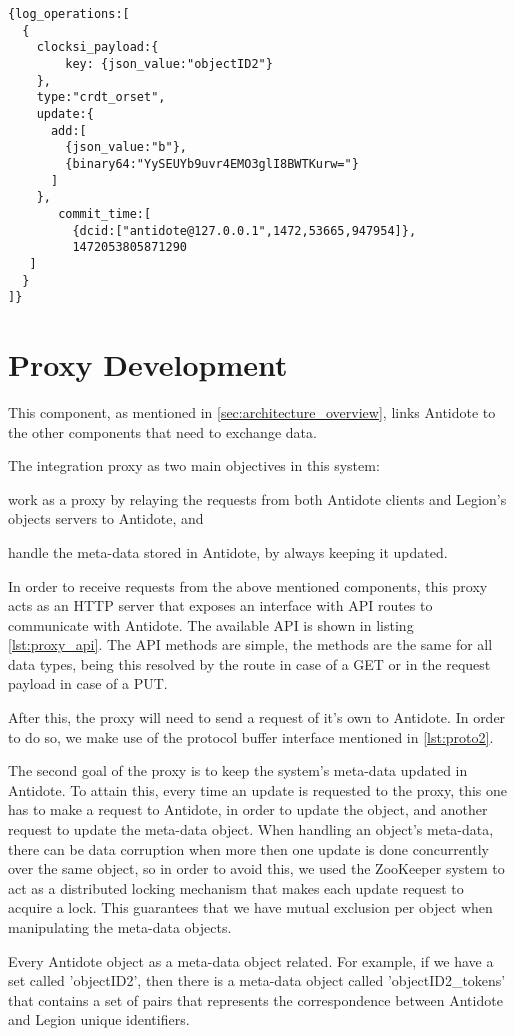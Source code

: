\begin{lstlisting}[caption={Antidote log response example},label={lst:log_example}]
{log_operations:[
  {
    clocksi_payload:{
        key: {json_value:"objectID2"}
    },
    type:"crdt_orset",
    update:{
      add:[
        {json_value:"b"},
        {binary64:"YySEUYb9uvr4EMO3glI8BWTKurw="}
      ]
    },
       commit_time:[
         {dcid:["antidote@127.0.0.1",1472,53665,947954]},
         1472053805871290
   ]
  }
]}
\end{lstlisting}

\section{Proxy Development}
\label{sec:proxy_development}
This component, as mentioned in \ref{sec:architecture_overview}, links Antidote to the other components that need to exchange data.\par
	The integration proxy as two main objectives in this system: 
\begin{enumerate*}[(i)]
\item work as a proxy by relaying the requests from both Antidote clients and Legion's objects servers to Antidote, and 
\item handle the meta-data stored in Antidote, by always keeping it updated.
\end{enumerate*}
\par
	In order to receive requests from the above mentioned components, this proxy acts as an HTTP server that exposes an interface with API routes to communicate with Antidote. The available API is shown in listing \ref{lst:proxy_api}. The API methods are simple, the methods are the same for all data types, being this resolved by the route in case of a GET or in the request payload in case of a PUT.\par
	After this, the proxy will need to send a request of it's own to Antidote. In order to do so, we make use of the protocol buffer interface mentioned in \ref{lst:proto2}.\par
	The second goal of the proxy is to keep the system's meta-data updated in Antidote. To attain this, every time an update is requested to the proxy, this one has to make a request to Antidote, in order to update the object, and another request to update the meta-data object. When handling an object's meta-data, there can be data corruption when more then one update is done concurrently over the same object, so in order to avoid this, we used the ZooKeeper system to act as a distributed locking mechanism that makes each update request to acquire a lock. This guarantees that we have mutual exclusion per object when manipulating the meta-data objects.\par
	Every Antidote object as a meta-data object related. For example, if we have a set called 'objectID2', then there is a meta-data object called 'objectID2\_tokens' that contains a set of pairs that represents the correspondence between Antidote and Legion unique identifiers.
	
